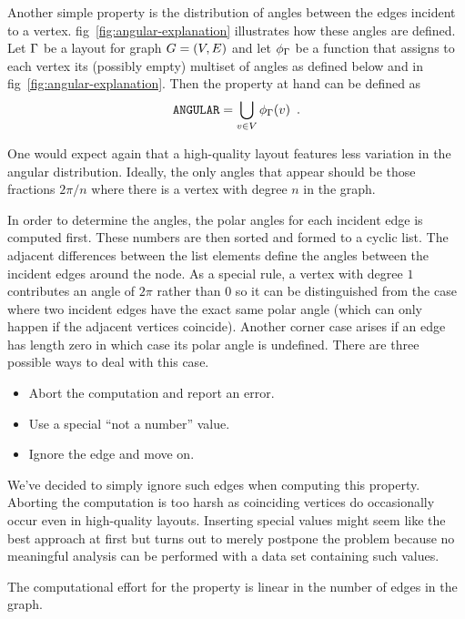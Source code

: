 \documentclass{graphstudy}
\begin{document}
Another simple property is the distribution of angles between the edges incident to a vertex.
\Acl{fig}~\ref{fig:angular-explanation} illustrates how these angles are defined.  Let \(\Gamma\) be a layout for graph
\(G=(V,E)\) and let \(\phi_\Gamma\) be a function that assigns to each vertex its (possibly empty) multiset of angles
as defined below and in \acl{fig}~\ref{fig:angular-explanation}.  Then the property at hand can be defined as
\begin{equation}
  \mbox{\text{\upshape\ttfamily ANGULAR}} = \operatorname*{\bigcup}_{v\in V}\phi_\Gamma(v) \enspace.
\end{equation}

One would expect again that a high-quality layout features less variation in the angular distribution.  Ideally, the
only angles that appear should be those fractions \(2\pi/n\) where there is a vertex with degree \(n\) in the graph.

In order to determine the angles, the polar angles for each incident edge is computed first.  These numbers are then
sorted and formed to a cyclic list.  The adjacent differences between the list elements define the angles between the
incident edges around the node.  As a special rule, a vertex with degree \(1\) contributes an angle of \(2\pi\) rather
than \(0\) so it can be distinguished from the case where two incident edges have the exact same polar angle (which can
only happen if the adjacent vertices coincide).  Another corner case arises if an edge has length zero in which case its
polar angle is undefined.  There are three possible ways to deal with this case.
\begin{itemize}
\item Abort the computation and report an error.
\item Use a special \enquote{not a number} value.
\item Ignore the edge and move on.
\end{itemize}
We've decided to simply ignore such edges when computing this property.  Aborting the computation is too harsh as
coinciding vertices do occasionally occur even in high-quality layouts.  Inserting special values might seem like the
best approach at first but turns out to merely postpone the problem because no meaningful analysis can be performed with
a data set containing such values.

The computational effort for the  property is linear in the number of edges in the graph.

\begin{Figure}
  \begin{center}
    
  \end{center}
  \caption[Angles considered by  property]{%
    Our definition of angles between incident edges as used in the  property illustrated.
  }
  \label{fig:angular-explanation}
\end{Figure}
\end{document}
